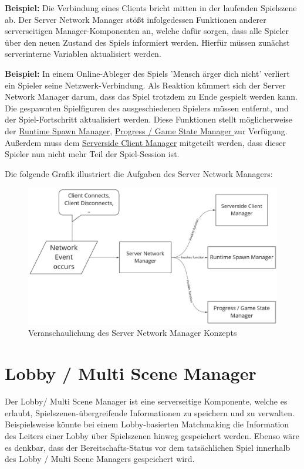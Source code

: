\textbf{Beispiel:} Die Verbindung eines Clients bricht mitten in der laufenden Spielszene ab. Der Server Network Manager stößt infolgedessen Funktionen anderer serverseitigen Manager-Komponenten an, welche dafür sorgen, dass alle Spieler über den neuen Zustand des Spiels informiert werden. Hierfür müssen zunächst serverinterne Variablen aktualisiert werden.

\textbf{Beispiel:} In einem Online-Ableger des Spiels 'Mensch ärger dich nicht' verliert ein Spieler seine Netzwerk-Verbindung. Als Reaktion kümmert sich der Server Network Manager darum, dass das Spiel trotzdem zu Ende gespielt werden kann. Die gespawnten Spielfiguren des ausgeschiedenen Spielers müssen entfernt, und der Spiel-Fortschritt aktualisiert werden. Diese Funktionen stellt möglicherweise der \hyperref[spawn_manager]{Runtime Spawn Manager}, \hyperref[progress_manager]{Progress / Game State Manager } zur Verfügung.
Außerdem muss dem \hyperref[serverside_client_manager]{Serverside Client Manager} mitgeteilt werden, dass dieser Spieler nun nicht mehr Teil der Spiel-Session ist.

Die folgende Grafik illustriert die Aufgaben des Server Network Managers:

\begin{figure}[H]
	\centering
	\includegraphics[width=150mm]{images/Server_Network_Manager.jpg}
	\caption[Server Network Manager Diagramm]{Veranschaulichung des Server Network Manager Konzepts}
	\label{pic:Server_Network_Manager}
\end{figure}

\section{Lobby / Multi Scene Manager}

Der Lobby/ Multi Scene Manager ist eine serverseitige Komponente, welche es erlaubt, Spielszenen-übergreifende Informationen zu speichern und zu verwalten. Beispielsweise könnte bei einem Lobby-basierten Matchmaking die Information des Leiters einer Lobby über Spielszenen hinweg gespeichert werden. Ebenso wäre es denkbar, dass der Bereitschafts-Status vor dem tatsächlichen Spiel innerhalb des Lobby / Multi Scene Managers gespeichert wird.

